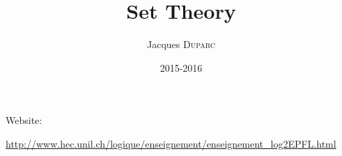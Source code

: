 

\title{Set Theory}
\author{Jacques \textsc{Duparc}}
\date{2015-2016}


\maketitle
\tableofcontents

\newpage

Website: 

\url{http://www.hec.unil.ch/logique/enseignement/enseignement_log2EPFL.html}





\nocite{*}








